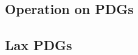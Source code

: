 \documentclass[the-pdg-manual.tex]{subfiles}
\begin{document}
	
	
	\subsection{Operation on PDGs}
	\subsection{Lax PDGs}

\end{document}
